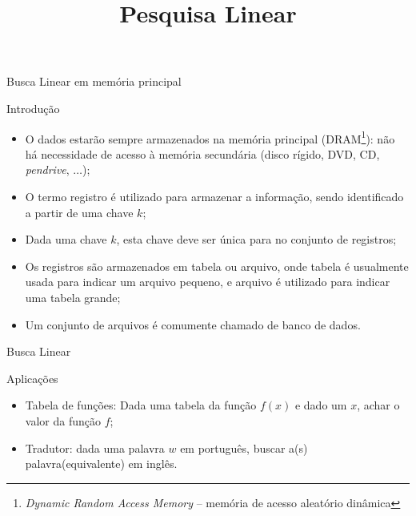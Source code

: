 \title{Pesquisa Linear}
\maketitle

\begin{frame}{Busca Linear em memória principal}

  \begin{block}{Introdução}
    \small
    \begin{itemize}[<+-| alert@+>]
    \item O dados estarão sempre armazenados na \alert{memória principal}
      (DRAM\footnote{{\it Dynamic Random Access Memory\/} -- memória de
        acesso aleatório dinâmica}): não há necessidade de acesso à memória
      secundária (disco rígido, DVD, CD, {\it pendrive\/}, $\ldots$);
    \item O termo \alert{registro} é utilizado para armazenar a
      informação, sendo identificado a partir de uma \alert{chave} $k$;
    \item Dada uma chave $k$, esta chave deve ser única para no conjunto de \alert{registros};
    \item Os registros são armazenados em \alert{tabela} ou
      \alert{arquivo}, onde \alert{tabela} é usualmente usada para indicar
      um arquivo pequeno, e \alert{arquivo} é utilizado para indicar uma
      tabela grande;
    \item Um conjunto de arquivos é comumente chamado de \alert{banco de
        dados}.
    \end{itemize}
  \end{block}

\end{frame}

\begin{frame}{Busca Linear}

  \begin{block}{Aplicações}
    \begin{itemize}[<+-| alert@+>]
    \item Tabela de funções: Dada uma tabela da função $f(x)$ e dado um $x$, achar o valor
      da função $f$;
    \item Tradutor: dada uma palavra $w$ em português, buscar a(s)
      palavra(equivalente) em inglês.
    \end{itemize}
  \end{block}

\end{frame}  


